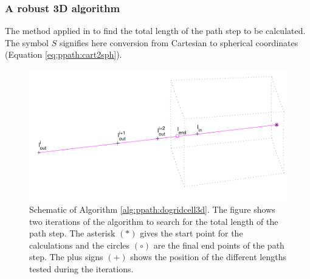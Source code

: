 \subsubsection{A robust 3D algorithm}
\label{sec:ppath:3dgeom}
%
\begin{algorithm}
 \begin{algorithmic}
   \ELSE
   \ENDIF
  \ENDWHILE
   \ELSE
   \ENDIF
   \ELSE
   \ENDIF
  \ENDWHILE
 \end{algorithmic}
 \caption{The method applied in  to find
   the total length of the path step to be calculated. The symbol $S$ signifies
   here conversion from Cartesian to spherical coordinates (Equation
   \ref{eq:ppath:cart2sph}).}
 \label{alg:ppath:dogridcell3d}
\end{algorithm}
%
\begin{figure}[!b]
 \begin{center}
  \includegraphics*[width=0.80\hsize]{ppath_3Dsearch}
  \caption{Schematic of Algorithm \ref{alg:ppath:dogridcell3d}. The
    figure shows two iterations of the algorithm to search for the
    total length of the path step. The asterisk $(\ast)$ gives the
    start point for the calculations and the circles $(\circ)$ are the
    final end points of the path step. The plus signs $(+)$ shows the
    position of the different lengths tested during the iterations.}
  \label{fig:ppath:3Dsearch}  
 \end{center}
\end{figure}

